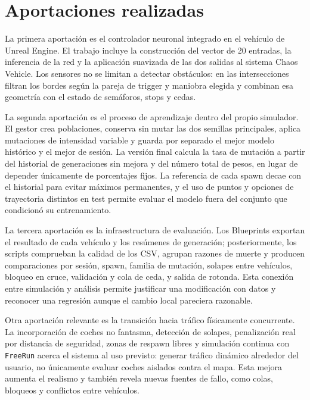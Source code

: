 \clearpage
\section{Aportaciones realizadas}

La primera aportación es el controlador neuronal integrado en el vehículo de Unreal Engine. El trabajo incluye la construcción del vector de 20 entradas, la inferencia de la red y la aplicación suavizada de las dos salidas al sistema Chaos Vehicle. Los sensores no se limitan a detectar obstáculos: en las intersecciones filtran los bordes según la pareja de trigger y maniobra elegida y combinan esa geometría con el estado de semáforos, stops y cedas.

La segunda aportación es el proceso de aprendizaje dentro del propio simulador. El gestor crea poblaciones, conserva sin mutar las dos semillas principales, aplica mutaciones de intensidad variable y guarda por separado el mejor modelo histórico y el mejor de sesión. La versión final calcula la tasa de mutación a partir del historial de generaciones sin mejora y del número total de pesos, en lugar de depender únicamente de porcentajes fijos. La referencia de cada spawn decae con el historial para evitar máximos permanentes, y el uso de puntos y opciones de trayectoria distintos en test permite evaluar el modelo fuera del conjunto que condicionó su entrenamiento.

La tercera aportación es la infraestructura de evaluación. Los Blueprints exportan el resultado de cada vehículo y los resúmenes de generación; posteriormente, los scripts comprueban la calidad de los CSV, agrupan razones de muerte y producen comparaciones por sesión, spawn, familia de mutación, solapes entre vehículos, bloqueo en cruce, validación y cola de ceda, y salida de rotonda. Esta conexión entre simulación y análisis permite justificar una modificación con datos y reconocer una regresión aunque el cambio local pareciera razonable.

Otra aportación relevante es la transición hacia tráfico físicamente concurrente. La incorporación de coches no fantasma, detección de solapes, penalización real por distancia de seguridad, zonas de respawn libres y simulación continua con \texttt{FreeRun} acerca el sistema al uso previsto: generar tráfico dinámico alrededor del usuario, no únicamente evaluar coches aislados contra el mapa. Esta mejora aumenta el realismo y también revela nuevas fuentes de fallo, como colas, bloqueos y conflictos entre vehículos.

